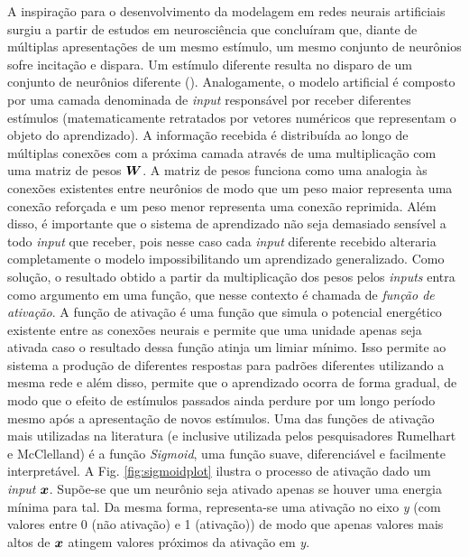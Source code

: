 A inspiração para o desenvolvimento da modelagem em redes neurais artificiais surgiu a partir de estudos em neurosciência %
que concluíram que, diante de múltiplas apresentações de um mesmo estímulo, um mesmo conjunto de neurônios sofre incitação e dispara. Um estímulo diferente resulta no disparo de um conjunto de neurônios diferente (\cite{hubel:1962}).  Analogamente, o modelo artificial é composto por uma camada denominada de \textit{input} responsável por receber diferentes estímulos (matematicamente retratados por vetores numéricos que representam o objeto do aprendizado). A informação recebida é distribuída ao longo de múltiplas conexões com a próxima camada através de uma multiplicação com uma matriz de pesos $\bm{W}$. A matriz de pesos funciona como uma analogia às conexões existentes entre neurônios de modo que um peso maior representa uma conexão reforçada e um peso menor representa uma conexão reprimida. Além disso, é importante que o sistema de aprendizado não seja demasiado sensível a todo \textit{input} que receber, pois nesse caso cada \textit{input} diferente recebido alteraria completamente o modelo impossibilitando um aprendizado generalizado. Como solução, o resultado obtido a partir da multiplicação dos pesos pelos \textit{inputs} entra como argumento em uma função, que nesse contexto é chamada de \textit{função de ativação}. A função de ativação é uma função que simula o potencial energético existente entre as conexões neurais e permite que uma unidade apenas seja ativada caso o resultado dessa função atinja um limiar mínimo. Isso permite ao sistema a produção de diferentes respostas para padrões diferentes utilizando a mesma rede e além disso, permite que o aprendizado ocorra de forma gradual, de modo que o efeito de estímulos passados ainda perdure por um longo período mesmo após a apresentação de novos estímulos. Uma das funções de ativação mais utilizadas na literatura (e inclusive utilizada pelos pesquisadores Rumelhart e McClelland) é a função \textit{Sigmoid}, uma função suave, diferenciável e facilmente interpretável. A Fig. \ref{fig:sigmoidplot} ilustra o processo de ativação dado um \textit{input} $\bm{x}$. Supõe-se que um neurônio seja ativado apenas se houver uma energia mínima para tal. Da mesma forma, representa-se uma ativação no eixo \textit{y} (com valores entre 0 (não ativação) e 1 (ativação)) de modo que apenas valores mais altos de $\bm{x}$ atingem valores próximos da ativação em \textit{y}.


